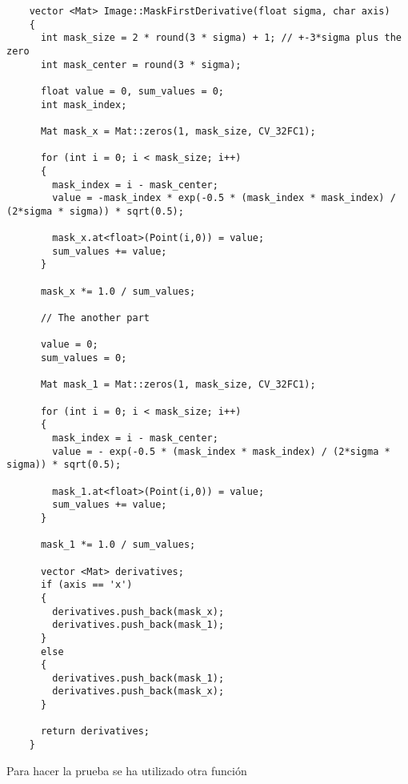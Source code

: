 \documentclass[a4paper, 11pt]{article}
\theoremstyle{definition}
\begin{document}
  \begin{lstlisting}
    vector <Mat> Image::MaskFirstDerivative(float sigma, char axis)
    {
      int mask_size = 2 * round(3 * sigma) + 1; // +-3*sigma plus the zero
      int mask_center = round(3 * sigma);

      float value = 0, sum_values = 0;
      int mask_index;

      Mat mask_x = Mat::zeros(1, mask_size, CV_32FC1);

      for (int i = 0; i < mask_size; i++)
      {
        mask_index = i - mask_center;
        value = -mask_index * exp(-0.5 * (mask_index * mask_index) / (2*sigma * sigma)) * sqrt(0.5);

        mask_x.at<float>(Point(i,0)) = value;
        sum_values += value;
      }

      mask_x *= 1.0 / sum_values;

      // The another part

      value = 0;
      sum_values = 0;

      Mat mask_1 = Mat::zeros(1, mask_size, CV_32FC1);

      for (int i = 0; i < mask_size; i++)
      {
        mask_index = i - mask_center;
        value = - exp(-0.5 * (mask_index * mask_index) / (2*sigma * sigma)) * sqrt(0.5);

        mask_1.at<float>(Point(i,0)) = value;
        sum_values += value;
      }

      mask_1 *= 1.0 / sum_values;

      vector <Mat> derivatives;
      if (axis == 'x')
      {
        derivatives.push_back(mask_x);
        derivatives.push_back(mask_1);
      }
      else
      {
        derivatives.push_back(mask_1);
        derivatives.push_back(mask_x);
      }

      return derivatives;
    }
  \end{lstlisting}

  Para hacer la prueba se ha utilizado otra función
\end{document}

